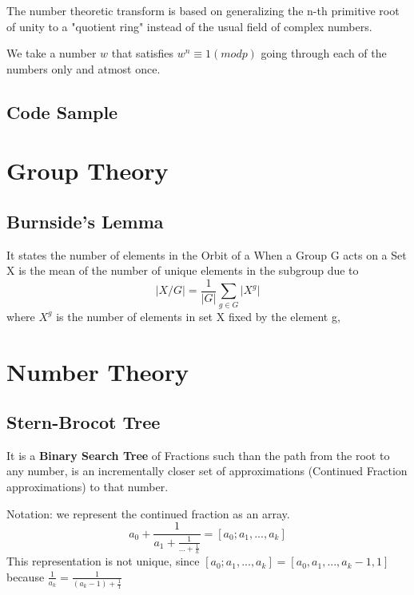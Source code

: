 The number theoretic transform is based on generalizing the n-th primitive root of unity to a "quotient ring" instead of the usual field of complex numbers.

We take a number $w$ that satisfies $w^n \equiv 1 (mod p)$ going through each of the numbers only and atmost once. 


\subsection{Code Sample}





\section{Group Theory}


\subsection{Burnside's Lemma}

It states the number of elements in the Orbit of a When a Group G acts on a Set X is the mean of the number of unique elements in the subgroup due to
\begin{equation}
  \vert X / G \vert = \frac{1}{\vert G \vert} \sum_{g \in G} \vert X^g \vert
\end{equation}
where $X^g$ is the number of elements in set X fixed by the element g, 



\section{Number Theory}


\subsection{Stern-Brocot Tree}

It is a \textbf{Binary Search Tree} of Fractions such than the path from the root to any number, is an incrementally closer set of approximations (Continued Fraction approximations) to that number.

Notation: we represent the continued fraction as an array.
\begin{equation*}
  a_0 + \frac{1}{a_1 + \frac{1}{... + \frac{1}{k}}} = [a_0; a_1, ..., a_k]
\end{equation*}
This representation is not unique, since
$[a_0; a_1, ..., a_k] = [a_0, a_1, ..., a_k - 1, 1]$ because $\frac{1}{a_k} = \frac{1}{(a_k-1) + \frac{1}{1}}$

